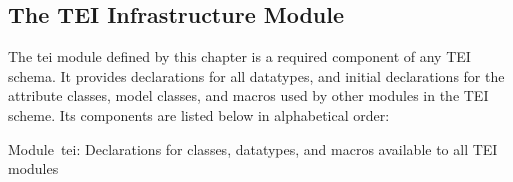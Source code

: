 \subsection[{The TEI Infrastructure Module}]{The TEI Infrastructure Module}\label{STOV}\par
The \textsf{tei} module defined by this chapter is a required component of any TEI schema. It provides declarations for all datatypes, and initial declarations for the attribute classes, model classes, and macros used by other modules in the TEI scheme. Its components are listed below in alphabetical order: \begin{description}

\item[{Module tei: Declarations for classes, datatypes, and macros available to all TEI modules}]\hspace{1em}\hfill\linebreak
\mbox{}\\[-10pt] \begin{itemize}

\end{itemize}
\end{description}
